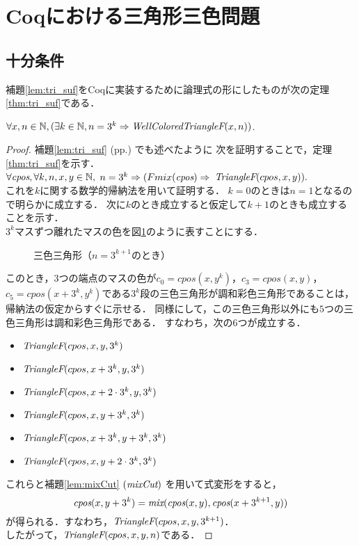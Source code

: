 \section{Coqにおける三角形三色問題}

\subsection{十分条件}
補題\ref{lem:tri_suf}をCoqに実装するために論理式の形にしたものが次の定理\ref{thm:tri_suf}である．
\begin{thm}[十分条件] \label{thm:tri_suf}
  $\forall x, n \in \mathbb{N}, (\exists k \in \mathbb{N}, n = 3 ^ k \Rightarrow \textit{WellColoredTriangleF}(x,n))$.
\end{thm}
\begin{proof}
  補題\ref{lem:tri_suf} (pp.\pageref{lem:tri_suf}) でも述べたように
  次を証明することで，定理\ref{thm:tri_suf}を示す．\\
  $\forall \textit{cpos}, \forall k, n, x, y \in \mathbb{N},$ $n = 3^k \Rightarrow (Fmix(\textit{cpos}) \Rightarrow$ $\textit{TriangleF}(cpos,x,y)).$ \\
  これを$k$に関する数学的帰納法を用いて証明する．
  $k=0$のときは$n=1$となるので明らかに成立する．
  次に$k$のとき成立すると仮定して$k+1$のときも成立することを示す．\\
  $3^k$マスずつ離れたマスの色を図\ref{fig:suf_steps}のように表すことにする．
  \begin{figure}[h]
    \centering
    
    \caption{三色三角形（$n=3^{k+1}$のとき）}
    \label{fig:suf_steps}
  \end{figure}
  このとき，$3$つの端点のマスの色が$c_0=cpos(x,y^k)$，$c_3=cpos(x,y)$，
  $c_5=cpos(x+3^k,y^k)$である$3^k$段の三色三角形が調和彩色三角形であることは，
  帰納法の仮定からすぐに示せる．
  同様にして，この三色三角形以外にも$5$つの三色三角形は調和彩色三角形である．
  すなわち，次の$6$つが成立する．
  \begin{itemize}
    \item $\textit{TriangleF}(cpos,x,y,3^k)$
    \item $\textit{TriangleF}(cpos,x+3^k,y,3^k)$
    \item $\textit{TriangleF}(cpos,x+2\cdot3^k,y,3^k)$
    \item $\textit{TriangleF}(cpos,x,y+3^k,3^k)$
    \item $\textit{TriangleF}(cpos,x+3^k,y+3^k,3^k)$
    \item $\textit{TriangleF}(cpos,x,y+2\cdot3^k,3^k)$
  \end{itemize} %
  これらと補題\ref{lem:mixCut} $(\textit{mixCut})$ を用いて式変形をすると，
  \[
  \textit{cpos}(x,y+3^k)=\textit{mix}(\textit{cpos}(x,y),\textit{cpos}(x+3^{k+1},y))
  \]
  が得られる．すなわち，$\textit{TriangleF}(cpos,x,y,3^{k+1})$．\\
  したがって，$\textit{TriangleF}(cpos,x,y,n)$である．
\end{proof}

